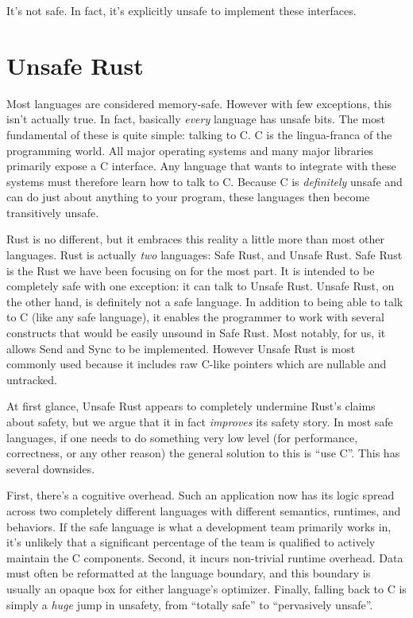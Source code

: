It's not safe. In fact, it's explicitly unsafe to implement these interfaces.



\section{Unsafe Rust}

Most languages are considered memory-safe. However with few exceptions, this
isn't actually true. In fact, basically \emph{every} language has unsafe bits.
The most fundamental of these is quite
simple: talking to C. C is the lingua-franca of the programming world. All
major operating systems and many major libraries primarily expose a C interface.
Any language that wants to integrate with these systems must therefore learn
how to talk to C. Because C is \emph{definitely} unsafe and can do just about anything
to your program, these languages then become transitively unsafe.

Rust is no different, but it embraces this reality a little more than most
other languages. Rust is actually \emph{two} languages: Safe Rust, and Unsafe Rust.
Safe Rust is the Rust we have been focusing on for the most part. It
is intended to be completely safe with one exception: it can talk to
Unsafe Rust. Unsafe Rust, on the other hand, is definitely not a safe language.
In addition to being able to talk to C (like any safe language), it enables the
programmer to work with several constructs that would be easily unsound in
Safe Rust. Most notably, for us, it allows Send and Sync to be implemented.
However Unsafe Rust is most commonly used because it includes raw C-like pointers
which are nullable and untracked.

At first glance, Unsafe Rust appears to completely undermine Rust's claims about
safety, but we argue that it in fact \emph{improves} its safety story. In most safe
languages, if one needs to do something very low level (for performance, correctness,
or any other reason) the general solution to this is ``use C''. This has several
downsides.

First, there's a cognitive overhead. Such an application now has
its logic spread across two completely different languages with different
semantics, runtimes, and behaviors. If the safe language is what a development
team primarily works in, it's unlikely that a significant percentage of the team
is qualified to actively maintain the C components. Second, it incurs non-trivial
runtime overhead. Data must often be reformatted at the language boundary, and
this boundary is usually an opaque box for either language's optimizer.
Finally, falling back to C is simply a \emph{huge} jump in unsafety, from ``totally
safe'' to ``pervasively unsafe''.

